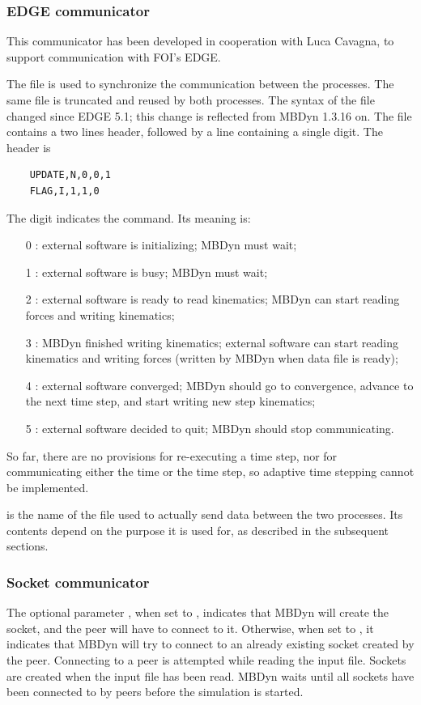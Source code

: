 \subsubsection{EDGE communicator}
This communicator has been developed in cooperation with Luca Cavagna,
to support communication with FOI's EDGE.

The file  is used to synchronize the communication
between the processes.
The same file is truncated and reused by both processes.
The syntax of the file changed since EDGE 5.1; this change is reflected
from MBDyn 1.3.16 on.
The file contains a two lines header, followed by a line containing a single digit.
The header is
\begin{verbatim}
    UPDATE,N,0,0,1
    FLAG,I,1,1,0
\end{verbatim}
The digit indicates the command.  Its meaning is:
\begin{itemize}
\item[0 :] external software is initializing; MBDyn must wait;
\item[1 :] external software is busy; MBDyn must wait;
\item[2 :] external software is ready to read kinematics; MBDyn can start reading forces and writing kinematics;
\item[3 :] MBDyn finished writing kinematics; external software can start reading kinematics and writing forces
	(written by MBDyn when data file is ready);
\item[4 :] external software converged; MBDyn should go to convergence, advance to the next time step,
and start writing new step kinematics;
\item[5 :] external software decided to quit; MBDyn should stop communicating.
\end{itemize}
So far, there are no provisions for re-executing a time step,
nor for communicating either the time or the time step,
so adaptive time stepping cannot be implemented.

 is the name of the file used to actually send data
between the two processes.
Its contents depend on the purpose it is used for,
as described in the subsequent sections.



\subsubsection{Socket communicator}
The optional parameter , when set to , indicates
that MBDyn will create the socket, and the peer will have to connect to it.
Otherwise, when set to , it indicates that MBDyn will try to connect
to an already existing socket created by the peer.
Connecting to a peer is attempted while reading the input file.
Sockets are created when the input file has been read.
MBDyn waits until all sockets have been connected to by peers
before the simulation is started.

